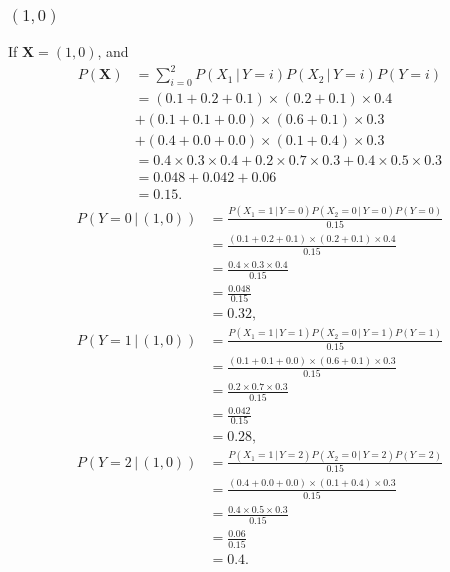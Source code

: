 \documentclass[10pt]{article}
\begin{document}
\subsubsection*{$(1, 0)$}
If $\textbf{X} = (1, 0)$, and
\begin{align*}
P(\textbf{X}) &= \sum_{i = 0}^2 P(X_1 \, | \, Y = i)P(X_2 \, | \, Y = i)P(Y = i) \\
             &= (0.1 + 0.2 + 0.1) \times (0.2 + 0.1) \times 0.4 \\
             &+ (0.1 + 0.1 + 0.0) \times (0.6 + 0.1) \times 0.3 \\
             &+ (0.4 + 0.0 + 0.0) \times (0.1 + 0.4) \times 0.3 \\
             &= 0.4 \times 0.3 \times 0.4 + 0.2 \times 0.7 \times 0.3 + 0.4 \times 0.5 \times 0.3 \\
			 &= 0.048 + 0.042 +   0.06 \\
			 &= 0.15.
\end{align*}
\begin{align*}
P(Y = 0 \, | \, (1, 0)) &= \frac{P(X_1= 1 \, | \, Y = 0)P(X_2 = 0 \, | \, Y = 0)P(Y = 0)}{ 0.15 } \\
     &= \frac{ (0.1 + 0.2 + 0.1) \times (0.2 + 0.1) \times 0.4 }{ 0.15 } \\
     &= \frac{ 0.4 \times 0.3 \times 0.4 }{ 0.15 } \\
     &= \frac{ 0.048 }{ 0.15 } \\
     &= 0.32,
\end{align*}
\begin{align*}
P(Y = 1 \, | \, (1, 0)) &= \frac{ P(X_1 = 1 \, | \, Y = 1)P(X_2 = 0 \, | \,  Y = 1)P(Y = 1)}{ 0.15 } \\
     &= \frac{ (0.1 + 0.1 + 0.0) \times (0.6 + 0.1) \times 0.3 }{ 0.15 } \\
     &= \frac{ 0.2 \times 0.7 \times 0.3 }{ 0.15 } \\
     &= \frac{ 0.042 }{ 0.15 } \\
     &= 0.28,
\end{align*}
\begin{align*}
P(Y = 2 \, | \, (1, 0)) &= \frac{ P(X_1 = 1 \, | \, Y = 2)P(X_2 = 0 \, | \, Y = 2)P(Y = 2) }{ 0.15 } \\
     &= \frac{ (0.4 + 0.0 + 0.0) \times (0.1 + 0.4) \times 0.3 }{ 0.15 } \\
     &= \frac{ 0.4 \times 0.5 \times 0.3}{ 0.15 } \\
     &= \frac{ 0.06 }{ 0.15 } \\
     &= 0.4.
\end{align*}
\end{document}
